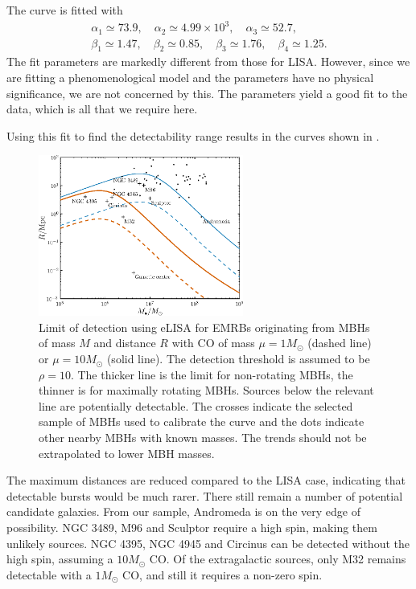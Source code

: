 The curve is fitted with
\begin{equation}
\begin{array}{c}
\alpha_1 \simeq 73.9, \quad \alpha_2 \simeq 4.99 \times 10^3, \quad \alpha_3 \simeq 52.7,\\
\beta_1 \simeq 1.47, \quad \beta_2 \simeq 0.85, \quad \beta_3 \simeq 1.76, \quad \beta_4 \simeq 1.25.
\end{array}
\end{equation}
The fit parameters are markedly different from those for LISA. However, since we are fitting a phenomenological model and the parameters have no physical significance, we are not concerned by this. The parameters yield a good fit to the data, which is all that we require here.

Using this fit to find the detectability range results in the curves shown in . 
\begin{figure}
\centering
 \includegraphics[width=0.6\textwidth]{./images/Fig_M_R_detect_2}
 \caption{Limit of detection using eLISA for EMRBs originating from MBHs of mass $M$ and distance $R$ with CO of mass $\mu = 1 M_\odot$ (dashed line) or $\mu = 10 M_\odot$ (solid line). The detection threshold is assumed to be $\rho = 10$. The thicker line is the limit for non-rotating MBHs, the thinner is for maximally rotating MBHs. Sources below the relevant line are potentially detectable. The crosses indicate the selected sample of MBHs used to calibrate the curve and the dots indicate other nearby MBHs with known masses. The trends should not be extrapolated to lower MBH masses.}
\label{fig:detect-eLISA}
\end{figure}
The maximum distances are reduced compared to the LISA case, indicating that detectable bursts would be much rarer. There still remain a number of potential candidate galaxies. From our sample, Andromeda is on the very edge of possibility. NGC 3489, M96 and Sculptor require a high spin, making them unlikely sources. NGC 4395, NGC 4945 and Circinus can be detected without the high spin, assuming a $10 M_\odot$ CO. Of the extragalactic sources, only M32 remains detectable with a $1 M_\odot$ CO, and still it requires a non-zero spin.

